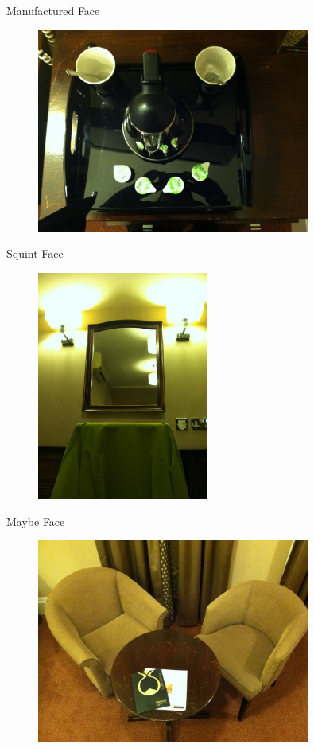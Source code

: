 \documentclass[compress]{beamer}
\begin{document}
\begin{frame}{Manufactured Face}
  \begin{figure}
    \includegraphics[width=0.8\textwidth]{assets/manufacturedface.jpg}
  \end{figure}
\end{frame}

\begin{frame}{Squint Face}
  \begin{figure}
    \includegraphics[width=0.5\textwidth]{assets/squintface.jpg}
  \end{figure}
\end{frame}

\begin{frame}{Maybe Face}
  \begin{figure}
    \includegraphics[width=0.8\textwidth]{assets/maybeface.jpg}
  \end{figure}
\end{frame}
\end{document}
